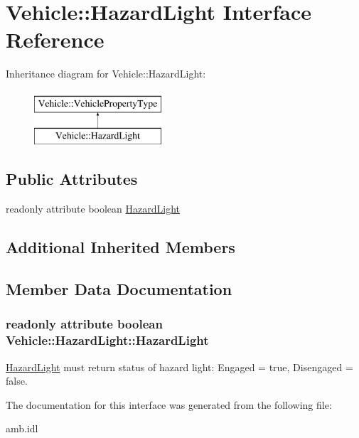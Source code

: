\hypertarget{interfaceVehicle_1_1HazardLight}{\section{Vehicle\-:\-:Hazard\-Light Interface Reference}
\label{interfaceVehicle_1_1HazardLight}
}
Inheritance diagram for Vehicle\-:\-:Hazard\-Light\-:\begin{figure}[H]
\begin{center}
\leavevmode
\includegraphics[height=2.000000cm]{interfaceVehicle_1_1HazardLight}
\end{center}
\end{figure}
\subsection*{Public Attributes}
\begin{DoxyCompactItemize}
\item 
readonly attribute boolean \hyperlink{interfaceVehicle_1_1HazardLight_a56bb9d06d90874397334c0ecff78fa0e}{Hazard\-Light}
\end{DoxyCompactItemize}
\subsection*{Additional Inherited Members}


\subsection{Member Data Documentation}
\hypertarget{interfaceVehicle_1_1HazardLight_a56bb9d06d90874397334c0ecff78fa0e}{
\subsubsection[{Hazard\-Light}]{\setlength{\rightskip}{0pt plus 5cm}readonly attribute boolean Vehicle\-::\-Hazard\-Light\-::\-Hazard\-Light}}\label{interfaceVehicle_1_1HazardLight_a56bb9d06d90874397334c0ecff78fa0e}
\hyperlink{interfaceVehicle_1_1HazardLight}{Hazard\-Light} must return status of hazard light\-: Engaged = true, Disengaged = false. 

The documentation for this interface was generated from the following file\-:\begin{DoxyCompactItemize}
\item 
amb.\-idl\end{DoxyCompactItemize}

